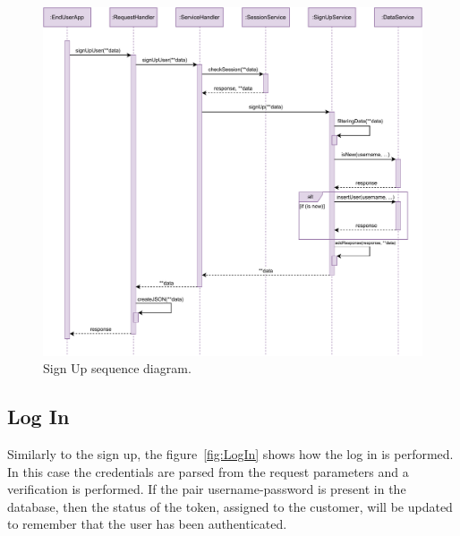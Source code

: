 \begin{figure}[H]
    \centering
    \includegraphics[width=1.0\textwidth]{images/signUp_sequence_diagram.pdf}
    \caption{Sign Up sequence diagram.}\label{fig:SignUp}
\end{figure}

\subsection{Log In}

Similarly to the sign up, the figure~\ref{fig:LogIn} shows how the log in is performed. In this case the credentials are parsed from the request parameters and a verification is performed. If the pair username-password is present in the database, then the status of the token, assigned to the customer, will be updated to remember that the user has been authenticated.

